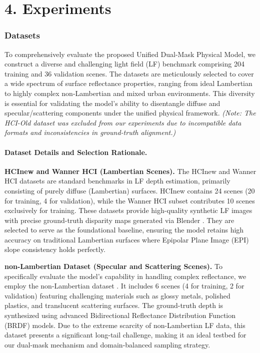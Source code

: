 \section{4. Experiments}

\subsubsection{Datasets}

To comprehensively evaluate the proposed Unified Dual-Mask Physical Model, we construct a diverse and challenging light field (LF) benchmark comprising 204 training and 36 validation scenes. The datasets are meticulously selected to cover a wide spectrum of surface reflectance properties, ranging from ideal Lambertian to highly complex non-Lambertian and mixed urban environments. This diversity is essential for validating the model's ability to disentangle diffuse and specular/scattering components under the unified physical framework. \textit{(Note: The HCI-Old dataset was excluded from our experiments due to incompatible data formats and inconsistencies in ground-truth alignment.)}

\paragraph{Dataset Details and Selection Rationale.}

\textbf{HCInew and Wanner HCI (Lambertian Scenes).} 
The HCInew  and Wanner HCI  datasets are standard benchmarks in LF depth estimation, primarily consisting of purely diffuse (Lambertian) surfaces. HCInew contains 24 scenes (20 for training, 4 for validation), while the Wanner HCI subset contributes 10 scenes exclusively for training. These datasets provide high-quality synthetic LF images with precise ground-truth disparity maps generated via Blender . They are selected to serve as the foundational baseline, ensuring the model retains high accuracy on traditional Lambertian surfaces where Epipolar Plane Image (EPI) slope consistency holds perfectly.

\textbf{non-Lambertian Dataset (Specular and Scattering Scenes).} 
To specifically evaluate the model's capability in handling complex reflectance, we employ the non-Lambertian dataset . It includes 6 scenes (4 for training, 2 for validation) featuring challenging materials such as glossy metals, polished plastics, and translucent scattering surfaces. The ground-truth depth is synthesized using advanced Bidirectional Reflectance Distribution Function (BRDF) models. Due to the extreme scarcity of non-Lambertian LF data, this dataset presents a significant long-tail challenge, making it an ideal testbed for our dual-mask mechanism and domain-balanced sampling strategy.

